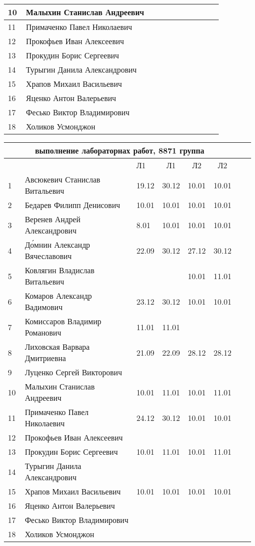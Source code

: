 \documentclass[a4paper,11pt]{article}
\newcommand*\ok{&{\small \ding{51}}} %
\newcommand*\no{&{\small }} %
\begin{document}
\begin{tabular}{p{7pt}|l|p{\CS}|p{\CS}|p{\CS}|p{\CS}|p{\CS}|p{\CS}|p{\CS}|p{\CS}|p{\CS}}
10\,&  Малыхин Станислав Андреевич      \no\no\no&&&&&\\
\midrule
11\,&  Примаченко Павел Николаевич      \no\ok\ok&&&&&\\
12\,&  Прокофьев Иван Алексеевич        \no\no\no&&&&&\\
13\,&  Прокудин Борис Сергеевич         \no\ok\ok&&&&&\\
14\,&  Турыгин Данила Александрович     \no\no\no&&&&\\
15\,&  Храпов Михаил Васильевич         \ok\ok\no&&&&\\
\midrule
16\,&  Яценко Антон Валерьевич          \no\ok\no&&&&&\\
17\,&  Фесько Виктор Владимирович       \no\no\no&&&&&\\
18\,&Холиков Усмонджон                  \no\no\ok&&&&&\\ 
\bottomrule
\end{tabular} 

\newpage
%
\begin{tabular}{l|llc|cccc}
\multicolumn{6}{c}{выполнение лабораторнах работ, 8871 группа} \\
\toprule
&&Л1&Л1& Л2&Л2\\
\midrule
1\,&  Авсюкевич Станислав Витальевич    &19.12& 30.12& 10.01& 10.01\\
2\,&  Бедарев Филипп Денисович          &10.01& 10.01& 10.01& 10.01\\
3\,&  Веренев Андрей Александрович      & 8.01& 10.01& 10.01& 10.01\\
4\,&  Д\'{о}мнин Александр Вячеславович &22.09& 30.12& 27.12& 30.12\\
5\,&   Ковлягин Владислав Витальевич    &     &      & 10.01& 11.01&\\
\midrule
6\,&  Комаров Александр Вадимович       &23.12& 30.12& 10.01& 10.01\\
7\,&  Комиссаров Владимир Романович     &11.01& 11.01&&\\
8\,&  Лиховская Варвара Дмитриевна      &21.09& 22.09& 28.12& 28.12\\
9\,&   Луценко Сергей Викторович        &&&&\\
10\,&  Малыхин Станислав Андреевич      &10.01& 11.01& 10.01& 11.01\\
\midrule
11\,&  Примаченко Павел Николаевич      &24.12& 30.12& 10.01& 10.01\\
12\,&  Прокофьев Иван Алексеевич        &&&&\\
13\,&  Прокудин Борис Сергеевич         &10.01& 11.01& 10.01& 11.01\\
14\,&  Турыгин Данила Александрович     &&&\\
15\,&  Храпов Михаил Васильевич         &10.01& 10.01& 10.01& 10.01\\
\midrule
16\,&  Яценко Антон Валерьевич          &&&&\\
17\,&  Фесько Виктор Владимирович       &&&&\\
18\,&Холиков Усмонджон                  &&&&\\
\bottomrule
\end{tabular}
\end{document}
